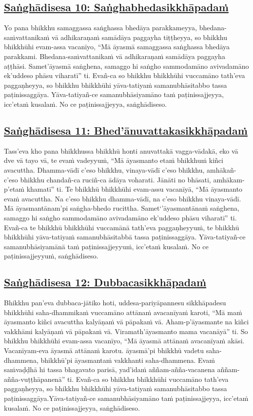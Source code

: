 \subsection*{\hyperref[comm10]{Saṅghādisesa 10: Saṅghabhedasikkhāpadaṁ}}
\label{sd10}
Yo pana bhikkhu samaggassa saṅghassa bhedāya parakkameyya, bhedana-saṁvattanikaṁ vā adhikaraṇaṁ samādāya paggayha tiṭṭheyya, so bhikkhu bhikkhūhi evam-assa vacanīyo, “Mā āyasmā samaggassa saṅghassa bhedāya parakkami. Bhedana-saṁvattanikaṁ vā adhikaraṇaṁ samādāya paggayha aṭṭhāsi. Samet’āyasmā saṅghena, samaggo hi saṅgho sammodamāno avivadamāno ek’uddeso phāsu viharatī” ti. Evañ-ca so bhikkhu bhikkhūhi vuccamāno tath’eva paggaṇheyya, so bhikkhu bhikkhūhi yāva-tatiyaṁ samanubhāsitabbo tassa paṭinissaggāya. Yāva-tatiyañ-ce samanubhāsiyamāno taṁ paṭinissajjeyya, icc’etaṁ kusalaṁ. No ce paṭinissajjeyya, saṅghādiseso.

\subsection*{\hyperref[comm11]{Saṅghādisesa 11: Bhed'ānuvattakasikkhāpadaṁ}}
\label{sd11}
Tass’eva kho pana bhikkhussa bhikkhū honti anuvattakā vagga-vādakā, eko vā dve vā tayo vā, te evaṁ vadeyyuṁ, “Mā āyasmanto etaṁ bhikkhuṁ kiñci avacuttha. Dhamma-vādī c’eso bhikkhu, vinaya-vādī c’eso bhikkhu, amhākañ-c’eso bhikkhu chandañ-ca ruciñ-ca ādāya voharati. Jānāti no bhāsati, amhākam-p’etaṁ khamatī” ti. Te bhikkhū bhikkhūhi evam-assu vacanīyā, “Mā āyasmanto evaṁ avacuttha. Na c’eso bhikkhu dhamma-vādī, na c’eso bhikkhu vinaya-vādī. Mā āyasmantānam'pi saṅgha-bhedo rucittha. Samet‘'āyasmantānaṁ saṅghena, samaggo hi saṅgho sammodamāno avivadamāno ek’uddeso phāsu viharatī” ti. Evañ-ca te bhikkhū bhikkhūhi vuccamānā tath’eva paggaṇheyyuṁ, te bhikkhū bhikkhūhi yāva-tatiyaṁ samanubhāsitabbā tassa paṭinissaggāya. Yāva-tatiyañ-ce samanubhāsiyamānā taṁ paṭinissajjeyyuṁ, icc’etaṁ kusalaṁ. No ce paṭinissajjeyyuṁ, saṅghādiseso.

\subsection*{\hyperref[comm12]{Saṅghādisesa 12: Dubbacasikkhāpadaṁ}}
\label{sd12}
Bhikkhu pan’eva dubbaca-jātiko hoti, uddesa-pariyāpannesu sikkhāpadesu bhikkhūhi saha-dhammikaṁ vuccamāno attānaṁ avacanīyaṁ karoti, “Mā maṁ āyasmanto kiñci avacuttha kalyāṇaṁ vā pāpakaṁ vā. Aham-p’āyasmante na kiñci vakkhāmi kalyāṇaṁ vā pāpakaṁ vā. Viramath’āyasmanto mama vacanāyā” ti. So bhikkhu bhikkhūhi evam-assa vacanīyo, “Mā āyasmā attānaṁ avacanīyaṁ akāsi. Vacanīyam-eva āyasmā attānaṁ karotu. āyasmā'pi bhikkhū vadetu saha-dhammena, bhikkhū'pi āyasmantaṁ vakkhanti saha-dhammena. Evaṁ saṁvaḍḍhā hi tassa bhagavato parisā, yad’idaṁ aññam-añña-vacanena aññam-añña-vuṭṭhāpanenā” ti. Evañ-ca so bhikkhu bhikkhūhi vuccamāno tath’eva paggaṇheyya, so bhikkhu bhikkhūhi yāva-tatiyaṁ samanubhāsitabbo tassa paṭinissaggāya.Yāva-tatiyañ-ce samanubhāsiyamāno taṁ paṭinissajjeyya, icc’etaṁ kusalaṁ. No ce paṭinissajjeyya, saṅghādiseso.

